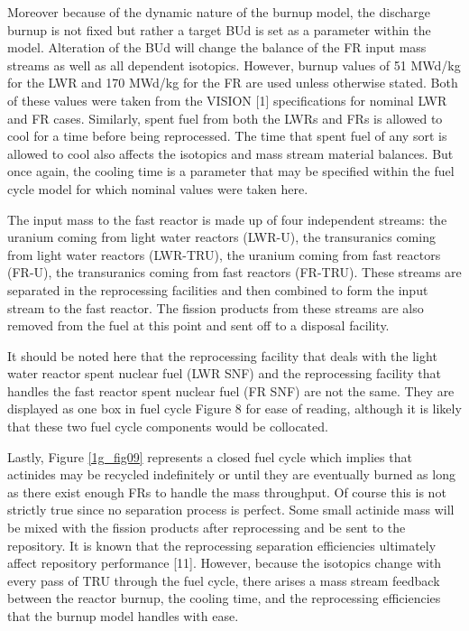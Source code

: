 Moreover because of the dynamic nature of the burnup model, the discharge burnup is not fixed but rather a 
target BUd is set as a parameter within the model.  Alteration of the BUd will change the balance of the FR 
input mass streams as well as all dependent isotopics.  However, burnup values of 51 MWd/kg for the LWR and 
170 MWd/kg for the FR are used unless otherwise stated.  Both of these values were taken from the VISION [1] 
specifications for nominal LWR and FR cases.  Similarly, spent fuel from both the LWRs and FRs is allowed to 
cool for a time before being reprocessed.  The time that spent fuel of any sort is allowed to cool also 
affects the isotopics and mass stream material balances.  But once again, the cooling time is a parameter 
that may be specified within the fuel cycle model for which nominal values were taken here.

The input mass to the fast reactor is made up of four independent streams: the uranium coming from light 
water reactors (LWR-U), the transuranics coming from light water reactors (LWR-TRU), the uranium coming 
from fast reactors (FR-U), the transuranics coming from fast reactors (FR-TRU).  These streams are separated 
in the reprocessing facilities and then combined to form the input stream to the fast reactor.  The fission 
products from these streams are also removed from the fuel at this point and sent off to a disposal facility.  

It should be noted here that the reprocessing facility that deals with the light water reactor spent nuclear 
fuel (LWR SNF) and the reprocessing facility that handles the fast reactor spent nuclear fuel (FR SNF) are not 
the same.  They are displayed as one box in fuel cycle Figure 8 for ease of reading, although it is likely that 
these two fuel cycle components would be collocated.

Lastly, Figure \ref{1g_fig09} represents a closed fuel cycle which implies that actinides may be recycled 
indefinitely or until they are eventually burned as long as there exist enough FRs to handle the mass 
throughput.  Of course this is not strictly true since no separation process is perfect.  Some small 
actinide mass will be mixed with the fission products after reprocessing and be sent to the repository.  
It is known that the reprocessing separation efficiencies ultimately affect repository performance [11].  
However, because the isotopics change with every pass of TRU through the fuel cycle, there arises a mass 
stream feedback between the reactor burnup, the cooling time, and the reprocessing efficiencies that the 
burnup model handles with ease. 

